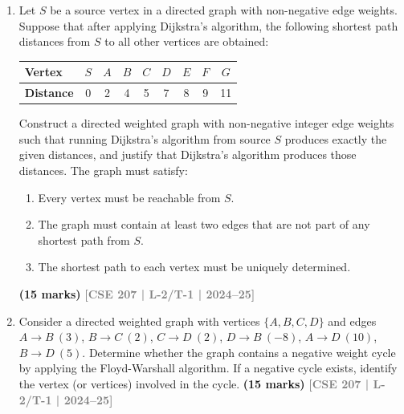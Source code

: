 \documentclass[12pt,a3paper]{article}
\newcommand{\yr}[1]{\hfill\textcolor{gray}{\small\textbf{[#1]}}}
\newcommand{\mk}[1]{\textcolor{orange!70!black}{\small\textbf{(#1 marks)}}}
\begin{document}
\begin{enumerate}

\item Let $S$ be a source vertex in a directed graph with non-negative edge weights. Suppose that after applying Dijkstra's algorithm, the following shortest path distances from $S$ to all other vertices are obtained:

\begin{center}
\begin{tabular}{l|cccccccc}
\textbf{Vertex}   & $S$ & $A$ & $B$ & $C$ & $D$ & $E$ & $F$ & $G$ \\ \hline
\textbf{Distance} & 0   & 2   & 4   & 5   & 7   & 8   & 9   & 11  
\end{tabular}
\end{center}
Construct a directed weighted graph with non-negative integer edge weights such that running Dijkstra's algorithm from source $S$ produces exactly the given distances, and justify that Dijkstra's algorithm produces those distances. The graph must satisfy: 

\begin{enumerate}

\item Every vertex must be reachable from $S$.
\item The graph must contain at least two edges that are not part of any shortest path from $S$.
\item The shortest path to each vertex must be uniquely determined.


\end{enumerate}
 \mk{15} \yr{CSE 207 | L-2/T-1 | 2024--25}

\item Consider a directed weighted graph with vertices $\{A, B, C, D\}$ and edges $A \to B\ (3)$, $B \to C\ (2)$, $C \to D\ (2)$, $D \to B\ (-8)$, $A \to D\ (10)$, $B \to D\ (5)$. Determine whether the graph contains a negative weight cycle by applying the Floyd-Warshall algorithm. If a negative cycle exists, identify the vertex (or vertices) involved in the cycle.
\mk{15} \yr{CSE 207 | L-2/T-1 | 2024--25}


\end{enumerate}
\end{document}
